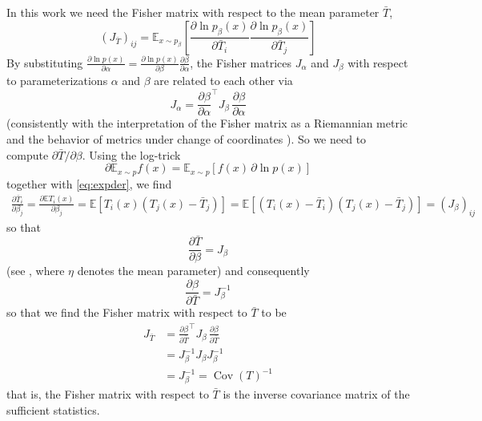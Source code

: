 \documentclass[11pt,a4paper]{article}
\DeclareMathOperator{\Cov}{Cov}
\newcommand{\E}{\mathbb{E}}
\newcommand{\1}{\mathbbm{1}}
\theoremstyle{yannthm}
\theoremstyle{yannthm2}
\newcommand{\transp}[1]{#1^{\!\top}\!}
\numberwithin{equation}{section}
\begin{document}
{In this work we need the Fisher matrix with respect to the mean parameter
$\bar T$,
\begin{equation}
(J_{\bar T})_{ij}=\E_{x\sim p_\beta}\left[
\frac{\partial \ln p_\beta(x)}{\partial \bar T_i}
\frac{\partial \ln p_\beta(x)}{\partial \bar T_j}
\right]
\end{equation}
By substituting $\frac{\partial \ln p(x)}{\partial \alpha}=\frac{\partial \ln
p(x)}{\partial \beta}\frac{\partial \beta}{\partial \alpha}$,
the Fisher matrices
$J_\alpha$ and $J_\beta$ with respect to parameterizations $\alpha$ and $\beta$ are
related to each other via
\begin{equation}
J_\alpha=\transp{\frac{\partial \beta}{\partial \alpha}}J_\beta\, \frac{\partial \beta}{\partial
\alpha}
\end{equation}
(consistently with the interpretation of the Fisher matrix as a
Riemannian metric and the behavior of metrics under change of coordinates
\cite[\S 2.3]{GHL87}).
So we need to compute $\partial{\bar T}/\partial \beta$. Using the
log-trick \begin{equation}
\partial \E_{x\sim p} f(x)=\E_{x\sim p} \left[f(x)\,\partial \ln
p(x)\right]
\end{equation}
together with \eqref{eq:expder}, we find
\begin{align}
\label{eq:expjac}
\frac{\partial \bar T_i}{\partial \beta_j}=
\frac{\partial \E T_i(x)}{\partial \beta_j}
=\E\left[ T_i(x)(T_j(x)-\bar T_j)
\right]=\E\left[ (T_i(x)-\bar T_i)(T_j(x)-\bar T_j)
\right]=(J_\beta)_{ij}
\end{align}
so that 
\begin{equation}
\frac{\partial \bar T}{\partial \beta}=J_\beta
\end{equation}
(see \cite[(3.32)]{Amari2000book},
where $\eta$ denotes the mean parameter) and consequently
\begin{equation}
\frac{\partial \beta}{\partial \bar T}=J_\beta^{-1}
\end{equation}
so that we find the Fisher matrix with respect to $\bar T$ to be
\begin{align}
J_{\bar T}&=\transp{\frac{\partial \beta}{\partial \bar T}}J_\beta\, \frac{\partial \beta}{\partial \bar T}
\\&=J_\beta^{-1} J_\beta J_\beta^{-1}
\\&=J_\beta^{-1}=\Cov(T)^{-1}
\label{eq:fishbarT}
\end{align}
that is, the Fisher matrix with respect to $\bar T$ is the inverse
covariance matrix of the sufficient statistics.

}
\end{document}

